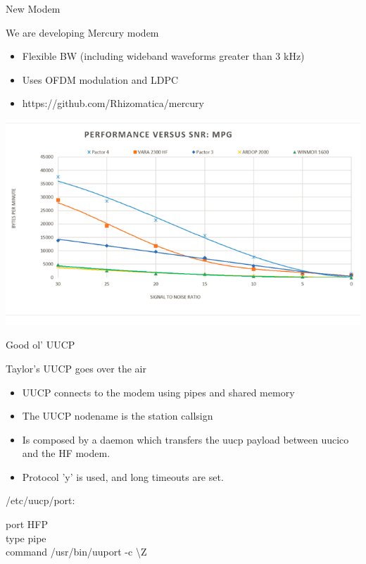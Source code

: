 \documentclass[aspectratio=169,xcolor={x11names,svgnames,dvipsnames}]{beamer}
\begin{document}
\begin{frame}{New Modem}

\begin{block}{We are developing Mercury modem}
    \begin{itemize}
    \item Flexible BW (including wideband waveforms greater than 3 kHz)
    \item Uses OFDM modulation and LDPC
    \item https://github.com/Rhizomatica/mercury
    \end{itemize}
  \end{block}

  \begin{center}
    \includegraphics[width=.55\columnwidth]{image_modems.png}
  \end{center}

\end{frame}

\begin{frame}{Good ol' UUCP}

\begin{block}{Taylor's UUCP goes over the air}
    \begin{itemize}
    \item UUCP connects to the modem using pipes and shared memory
    \item The UUCP nodename is the station callsign
    \item Is composed by a daemon which transfers the uucp payload between uucico and the HF modem.
    \item Protocol 'y' is used, and long timeouts are set.
    \end{itemize}
  \end{block}

/etc/uucp/port:
\vspace{0.5cm}

port HFP
\\
type pipe\\
command /usr/bin/uuport -c \textbackslash Z

\end{frame}
\end{document}
